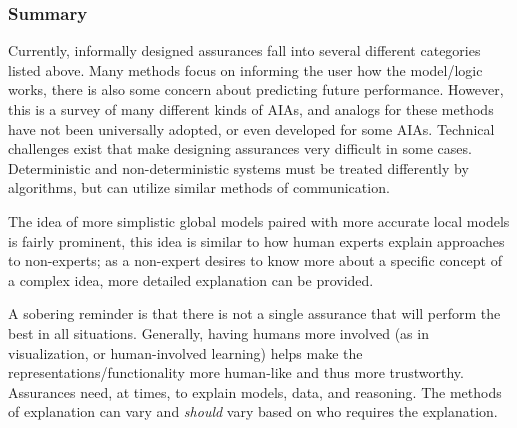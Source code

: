 \subsubsection{Summary}
Currently, informally designed assurances fall into several different categories listed above. Many methods focus on informing the user how the model/logic works, there is also some concern about predicting future performance. However, this is a survey of many different kinds of AIAs, and analogs for these methods have not been universally adopted, or even developed for some AIAs. Technical challenges exist that make designing assurances very difficult in some cases. Deterministic and non-deterministic systems must be treated differently by algorithms, but can utilize similar methods of communication.

The idea of more simplistic global models paired with more accurate local models is fairly prominent, this idea is similar to how human experts explain approaches to non-experts; as a non-expert desires to know more about a specific concept of a complex idea, more detailed explanation can be provided.

A sobering reminder is that there is not a single assurance that will perform the best in all situations. Generally, having humans more involved (as in visualization, or human-involved learning) helps make the representations/functionality more human-like and thus more trustworthy. Assurances need, at times, to explain models, data, and reasoning. The methods of explanation can vary and \emph{should} vary based on who requires the explanation.

